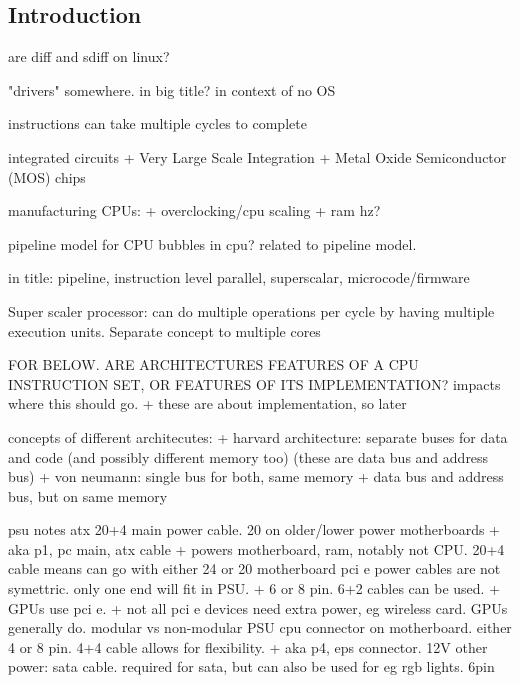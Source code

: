 
\subsection{Introduction}

are diff and sdiff on linux?

"drivers" somewhere. in big title?
in context of no OS

instructions can take multiple cycles to complete

integrated circuits
+ Very Large Scale Integration
+ Metal Oxide Semiconductor (MOS) chips

manufacturing CPUs:
+ overclocking/cpu scaling
+ ram hz?

pipeline model for CPU
bubbles in cpu? related to pipeline model.

in title: pipeline, instruction level parallel, superscalar, microcode/firmware

Super scaler processor: can do multiple operations per cycle by having multiple execution units. Separate concept to multiple cores





















FOR BELOW. ARE ARCHITECTURES FEATURES OF A CPU INSTRUCTION SET, OR FEATURES OF ITS IMPLEMENTATION? impacts where this should go.
+ these are about implementation, so later









concepts of different architecutes:
+ harvard architecture: separate buses for data and code (and possibly different memory too) (these are data bus and address bus)
+ von neumann: single bus for both, same memory
+ data bus and address bus, but on same memory






psu notes
atx 20+4 main power cable. 20 on older/lower power motherboards
+ aka p1, pc main, atx cable
+ powers motherboard, ram, notably not CPU. 20+4 cable means can go with either 24 or 20 motherboard
pci e power cables are not symettric. only one end will fit in PSU.
+ 6 or 8 pin. 6+2 cables can be used.
+ GPUs use pci e.
+ not all pci e devices need extra power, eg wireless card. GPUs generally do.
modular vs non-modular PSU
cpu connector on motherboard. either 4 or 8 pin. 4+4 cable allows for flexibility.
+ aka p4, eps connector. 12V
other power: sata cable. required for sata, but can also be used for eg rgb lights. 6pin

